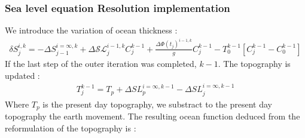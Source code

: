 \documentclass[letterpaper,10pt,english]{sphinxmanual}
\begin{document}
\subsubsection{Sea level equation Resolution implementation}
\label{\detokenize{numerical_imp:sea-level-equation-resolution-implementation}}\label{\detokenize{numerical_imp:sle-res}}
\sphinxAtStartPar
We introduce the variation of ocean thickness :
\begin{equation*}
\begin{split}\delta S^{i,k}_j=-\Delta S^{i=\infty,k}_{j-1} + \Delta \mathcal{SL}^{i-1,k}_j C^{k-1}_j + \frac{\Delta \Phi (t_j)^{i-1,k}}{g} C^{k-1}_j - T_0^{k-1}[C_j^{k-1} - C_0^{k-1}]\end{split}
\end{equation*}
\sphinxAtStartPar
If the last step of the outer iteration was completed, \(k-1\). The topography is updated :
\begin{equation*}
\begin{split}T_j^{k-1} = T_p  + \Delta SL_p^{i=\infty,k-1} - \Delta SL_j^{i=\infty,k-1}\end{split}
\end{equation*}
\sphinxAtStartPar
Where \(T_p\) is the present day topography, we substract to the present day topography the earth movement. The resulting ocean function deduced from the reformulation of the topography is :
\end{document}
